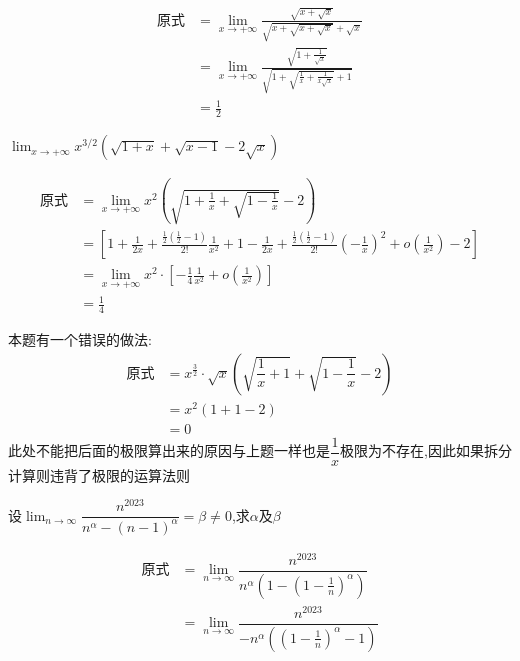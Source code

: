 \documentclass[8pt a4paper, oneside, UTF8]{ctexbook}
\begin{document}
\begin{sloppypar}
\begin{note}
\begin{align*}
          \text{原式} & =\lim_{x\to+\infty}\frac{\sqrt{x+\sqrt{x}}}{\sqrt{x+\sqrt{x+\sqrt{x}}}+\sqrt{x}}\\    
          & = \lim_{x\to+\infty}\frac{\sqrt{1+\frac1{\sqrt{x}}}}{\sqrt{1+\sqrt{\frac1x+\frac1{x\sqrt{x}}}+1}} \\
          & = \frac{1}{2}
        \end{align*}
    \end{note}
    \begin{problem}
        \uline{$\lim_{x\to+\infty}x^{3/2}\left(\sqrt{1+x}+\sqrt{x-1}-2\sqrt{x}\right)$}
    \end{problem}
    \begin{solution}
        \begin{align*}
            \text{原式} & = \lim_{x\to+\infty}  x^2(\sqrt{1+\frac{1}{x}+\sqrt{1-\frac{1}{x}}}-2)  \\
            & = [1+\frac{1}{2x}+\frac{\frac{1}{2}(\frac{1}{2}-1)}{2!}\frac{1}{x^{2}}+1-\frac{1}{2x}+\frac{\frac{1}{2}(\frac{1}{2}-1)}{2!}(-\frac{1}{x})^{2}+o(\frac{1}{x^{2}})-2] \\
            & = \lim_{x\to+\infty}x^{2}\cdot[-\frac{1}{4}\frac{1}{x^{2}}+o(\frac{1}{x^{2}})] \\
            & = \frac{1}{4}
        \end{align*}
    \end{solution}
    \begin{note}
        本题有一个错误的做法:
        \begin{align*}
          \text{原式} & = x^{\frac{3}{2}}\cdot \sqrt{x}(\sqrt{\dfrac{1}{x}+1}+\sqrt{1-\dfrac{1}{x}}-2)\\
          & = x^2(1+1-2)\\
          & = 0
        \end{align*}
        此处不能把后面的极限算出来的原因与上题一样也是$\dfrac{1}{x}$极限为不存在,因此如果拆分计算则违背了极限的运算法则
    \end{note}
    \begin{problem}
        设$\lim_{n\to\infty}\dfrac{n^{2023}}{n^{\alpha}-(n-1)^{\alpha}}=\beta\neq0$,求$\alpha$及$\beta$
    \end{problem}
    \begin{solution}
        \begin{align*}
          \text{原式} & = \lim_{n\to\infty} \dfrac{n^{2023}}{n^\alpha(1-(1-\frac{1}{n})^\alpha)}\\
          & = \lim_{n\to\infty} \dfrac{n^{2023}}{-n^\alpha((1-\frac{1}{n})^\alpha-1)}\\

\end{align*}
\end{solution}
\end{sloppypar}
\end{document}
